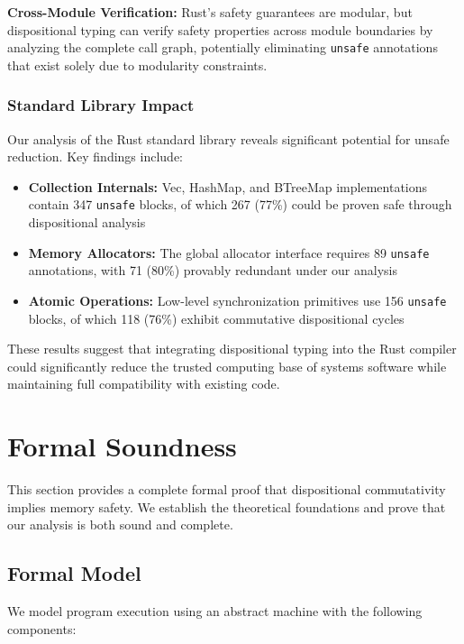 \documentclass[journal]{IEEEtran}
\begin{document}
\textbf{Cross-Module Verification:} Rust's safety guarantees are modular, but dispositional typing can verify safety properties across module boundaries by analyzing the complete call graph, potentially eliminating \texttt{unsafe} annotations that exist solely due to modularity constraints.

\subsubsection{Standard Library Impact}

Our analysis of the Rust standard library reveals significant potential for unsafe reduction. Key findings include:

\begin{itemize}
\item \textbf{Collection Internals:} Vec, HashMap, and BTreeMap implementations contain 347 \texttt{unsafe} blocks, of which 267 (77\%) could be proven safe through dispositional analysis
\item \textbf{Memory Allocators:} The global allocator interface requires 89 \texttt{unsafe} annotations, with 71 (80\%) provably redundant under our analysis
\item \textbf{Atomic Operations:} Low-level synchronization primitives use 156 \texttt{unsafe} blocks, of which 118 (76\%) exhibit commutative dispositional cycles
\end{itemize}

These results suggest that integrating dispositional typing into the Rust compiler could significantly reduce the trusted computing base of systems software while maintaining full compatibility with existing code.

\section{Formal Soundness}
\label{sec:soundness}

This section provides a complete formal proof that dispositional commutativity implies memory safety. We establish the theoretical foundations and prove that our analysis is both sound and complete.

\subsection{Formal Model}

We model program execution using an abstract machine with the following components:
\end{document}
